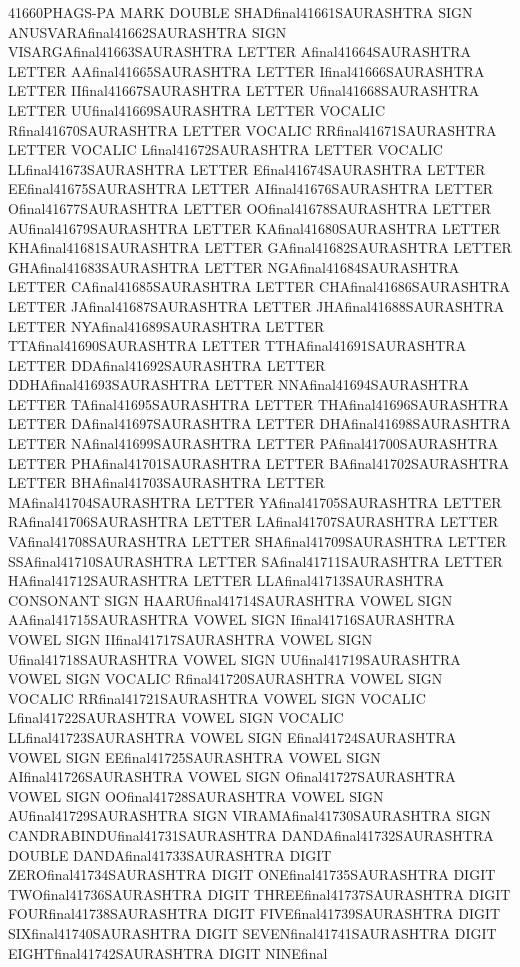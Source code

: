 41660PHAGS-PA MARK DOUBLE SHADfinal41661SAURASHTRA SIGN ANUSVARAfinal41662SAURASHTRA SIGN VISARGAfinal41663SAURASHTRA LETTER Afinal41664SAURASHTRA LETTER AAfinal41665SAURASHTRA LETTER Ifinal41666SAURASHTRA LETTER IIfinal41667SAURASHTRA LETTER Ufinal41668SAURASHTRA LETTER UUfinal41669SAURASHTRA LETTER VOCALIC Rfinal41670SAURASHTRA LETTER VOCALIC RRfinal41671SAURASHTRA LETTER VOCALIC Lfinal41672SAURASHTRA LETTER VOCALIC LLfinal41673SAURASHTRA LETTER Efinal41674SAURASHTRA LETTER EEfinal41675SAURASHTRA LETTER AIfinal41676SAURASHTRA LETTER Ofinal41677SAURASHTRA LETTER OOfinal41678SAURASHTRA LETTER AUfinal41679SAURASHTRA LETTER KAfinal41680SAURASHTRA LETTER KHAfinal41681SAURASHTRA LETTER GAfinal41682SAURASHTRA LETTER GHAfinal41683SAURASHTRA LETTER NGAfinal41684SAURASHTRA LETTER CAfinal41685SAURASHTRA LETTER CHAfinal41686SAURASHTRA LETTER JAfinal41687SAURASHTRA LETTER JHAfinal41688SAURASHTRA LETTER NYAfinal41689SAURASHTRA LETTER TTAfinal41690SAURASHTRA LETTER TTHAfinal41691SAURASHTRA LETTER DDAfinal41692SAURASHTRA LETTER DDHAfinal41693SAURASHTRA LETTER NNAfinal41694SAURASHTRA LETTER TAfinal41695SAURASHTRA LETTER THAfinal41696SAURASHTRA LETTER DAfinal41697SAURASHTRA LETTER DHAfinal41698SAURASHTRA LETTER NAfinal41699SAURASHTRA LETTER PAfinal41700SAURASHTRA LETTER PHAfinal41701SAURASHTRA LETTER BAfinal41702SAURASHTRA LETTER BHAfinal41703SAURASHTRA LETTER MAfinal41704SAURASHTRA LETTER YAfinal41705SAURASHTRA LETTER RAfinal41706SAURASHTRA LETTER LAfinal41707SAURASHTRA LETTER VAfinal41708SAURASHTRA LETTER SHAfinal41709SAURASHTRA LETTER SSAfinal41710SAURASHTRA LETTER SAfinal41711SAURASHTRA LETTER HAfinal41712SAURASHTRA LETTER LLAfinal41713SAURASHTRA CONSONANT SIGN HAARUfinal41714SAURASHTRA VOWEL SIGN AAfinal41715SAURASHTRA VOWEL SIGN Ifinal41716SAURASHTRA VOWEL SIGN IIfinal41717SAURASHTRA VOWEL SIGN Ufinal41718SAURASHTRA VOWEL SIGN UUfinal41719SAURASHTRA VOWEL SIGN VOCALIC Rfinal41720SAURASHTRA VOWEL SIGN VOCALIC RRfinal41721SAURASHTRA VOWEL SIGN VOCALIC Lfinal41722SAURASHTRA VOWEL SIGN VOCALIC LLfinal41723SAURASHTRA VOWEL SIGN Efinal41724SAURASHTRA VOWEL SIGN EEfinal41725SAURASHTRA VOWEL SIGN AIfinal41726SAURASHTRA VOWEL SIGN Ofinal41727SAURASHTRA VOWEL SIGN OOfinal41728SAURASHTRA VOWEL SIGN AUfinal41729SAURASHTRA SIGN VIRAMAfinal41730SAURASHTRA SIGN CANDRABINDUfinal41731SAURASHTRA DANDAfinal41732SAURASHTRA DOUBLE DANDAfinal41733SAURASHTRA DIGIT ZEROfinal41734SAURASHTRA DIGIT ONEfinal41735SAURASHTRA DIGIT TWOfinal41736SAURASHTRA DIGIT THREEfinal41737SAURASHTRA DIGIT FOURfinal41738SAURASHTRA DIGIT FIVEfinal41739SAURASHTRA DIGIT SIXfinal41740SAURASHTRA DIGIT SEVENfinal41741SAURASHTRA DIGIT EIGHTfinal41742SAURASHTRA DIGIT NINEfinal